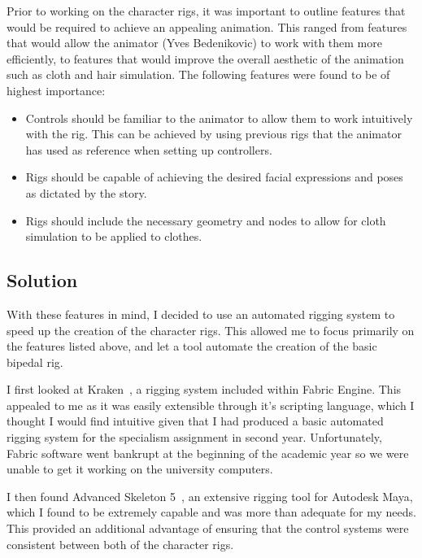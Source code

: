 \documentclass[11pt]{article}
\begin{document}
Prior to working on the character rigs, it was important to outline features that would be required to achieve an appealing animation. This ranged from features that would allow the animator (Yves Bedenikovic) to work with them more efficiently, to features that would improve the overall aesthetic of the animation such as cloth and hair simulation. The following features were found to be of highest importance:

\begin{itemize}

\item Controls should be familiar to the animator to allow them to work intuitively with the rig. This can be achieved by using previous rigs that the animator has used as reference when setting up controllers.

\item Rigs should be capable of achieving the desired facial expressions and poses as dictated by the story.

\item Rigs should include the necessary geometry and nodes to allow for cloth simulation to be applied to clothes.

\end{itemize}

\subsection{Solution}

With these features in mind, I decided to use an automated rigging system to speed up the creation of the character rigs. This allowed me to focus primarily on the features listed above, and let a tool automate the creation of the basic bipedal rig.

I first looked at Kraken~\cite{kraken}, a rigging system included within Fabric Engine. This appealed to me as it was easily extensible through it's scripting language, which I thought I would find intuitive given that I had produced a basic automated rigging system for the specialism assignment in second year. Unfortunately, Fabric software went bankrupt at the beginning of the academic year so we were unable to get it working on the university computers.

I then found Advanced Skeleton 5~\cite{advancedSkeleton}, an extensive rigging tool for Autodesk Maya, which I found to be extremely capable and was more than adequate for my needs. This provided an additional advantage of ensuring that the control systems were consistent between both of the character rigs.
\end{document}
